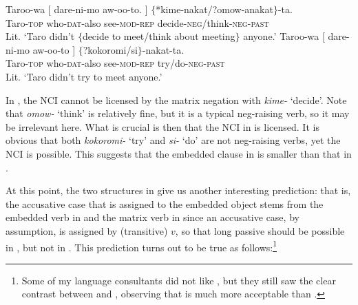 \documentclass[output=paper]{langsci/langscibook}
\begin{document}
\ea\label{shimamu27}
\begin{xlist} 
\ex\label{shimamu27a}  {\gll Taroo-wa [ dare-ni-mo aw-oo-to. ] $\{$*kime-nakat/?omow-anakat$\}$-ta.\\
Taro-\textsc{top} {} who-\textsc{dat}-also see-\textsc{mod-rep} {} \phantom{$\{$*}decide-\textsc{neg}/think-\textsc{neg}-\textsc{past}\\
\glt Lit. `Taro didn't $\{$decide to meet/think about meeting$\}$ anyone.'}
\ex\label{shimamu27b} \gll Taroo-wa [ dare-ni-mo aw-oo-to ] $\{$?kokoromi/si$\}$-nakat-ta.\\
Taro-\textsc{top} {} who-\textsc{dat}-also see-\textsc{mod-rep} {} try/do-\textsc{neg-past}\\
\glt Lit. `Taro didn't try to meet anyone.'
\end{xlist}
\z
In , the NCI cannot be licensed by the matrix negation with \textit{kime-} `decide'. Note that \textit{omow-} `think' is relatively fine, but it is a typical neg-raising verb, so it may be irrelevant here. What is crucial is then that the NCI in  is licensed. It is obvious that both \textit{kokoromi-} `try' and \textit{si-} `do' are not neg-raising verbs, yet the NCI is possible. This suggests that the embedded clause in  is smaller than that in .

At this point, the two structures in  give us another interesting prediction: that is, the accusative case that is assigned to the embedded object stems from the embedded verb in  and the matrix verb in  since an accusative case, by assumption, is assigned by (transitive) $v$, so that long passive should be possible in , but not in . This prediction turns out to be true as follows:\footnote{Some of my language consultants did not like , but they still saw the clear contrast between  and , observing that  is much more acceptable than .}
\end{document}
